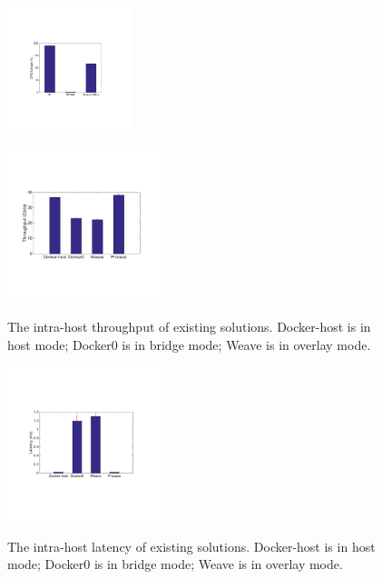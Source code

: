      \begin{figure}[ht]
     \centering 
     \includegraphics[width=0.32\textwidth]{figures/motivation/eval_baremetal_cpu.pdf}      
     \label{fig:eval_baremetal_cpu}
     \caption{} 
     \end{figure}

\begin{figure}[ht]
     \centering 
     \includegraphics[width=0.4\textwidth]{figures/motivation/eval_exist_bw.pdf} 
     \label{fig:eval_exist_bw}
     \caption{The intra-host throughput of existing solutions. Docker-host is in host mode; Docker0 is in bridge mode; Weave is in overlay mode.} 
\end{figure} 

\begin{figure}[ht]
     \centering 
     \includegraphics[width=0.4\textwidth]{figures/motivation/eval_exist_latency.pdf} 
     \label{fig:eval_exist_latency}
     \caption{The intra-host latency of existing solutions. Docker-host is in host mode; Docker0 is in bridge mode; Weave is in overlay mode.} 
\end{figure} 

